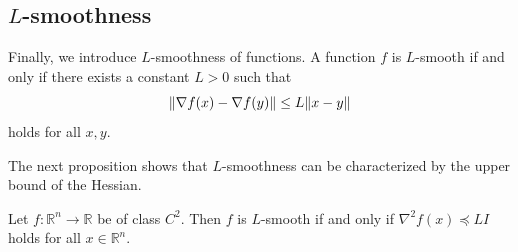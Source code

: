 \documentclass[0_en]{subfiles}
\begin{document}
\subsection{$L$-smoothness}

Finally, we introduce $L$-smoothness of functions.
A function $f$ is $L$-smooth if and only if there exists a constant $L>0$ such that
\begin{equation}\label{eq:def_LSmooth}
    \norm{\nabla f(x)-\nabla f(y)} \le L\norm{x-y}
\end{equation}
holds for all $x,y$.

The next proposition shows that $L$-smoothness can be characterized by the upper bound of the Hessian.
\begin{proposition}\label{prop:smoothness-hessian}
    Let $f \colon \mathbb{R}^n \to \mathbb{R}$ be of class $C^2$. Then $f$ is $L$-smooth if and only if $\nabla^2 f(x)\preceq L I$ holds for all $x \in \mathbb{R}^n$.
\end{proposition}
\end{document}
